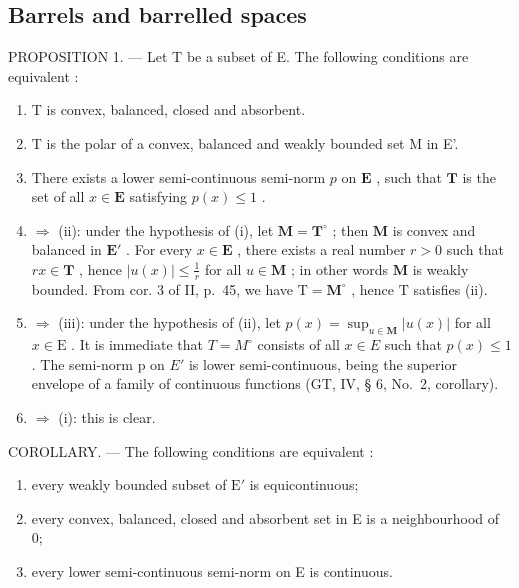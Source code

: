 \subsection{Barrels and barrelled spaces}

PROPOSITION 1. --- Let T be a subset of E. The following conditions are equivalent :

\begin{enumerate}
\def\labelenumi{(\roman{enumi})}
\item
  T is convex, balanced, closed and absorbent.
\item
  T is the polar of a convex, balanced and weakly bounded set M in E'.
\item
  There exists a lower semi-continuous semi-norm \(p\) on \(\mathbf{E}\) , such that \(\mathbf{T}\) is the set of all \(x \in \mathbf{E}\) satisfying \(p(x) \leqslant 1\) .
\item
  \(\Rightarrow\) (ii): under the hypothesis of (i), let \(\mathbf{M} = \mathbf{T}^{\circ}\) ; then \(\mathbf{M}\) is convex and balanced in \(\mathbf{E}'\) . For every \(x \in \mathbf{E}\) , there exists a real number \(r > 0\) such that \(rx \in \mathbf{T}\) , hence \(|u(x)| \leqslant \frac{1}{r}\) for all \(u \in \mathbf{M}\) ; in other words \(\mathbf{M}\) is weakly bounded. From cor. 3 of II, p.~45, we have \(\mathrm{T} = \mathbf{M}^{\circ}\) , hence \(\mathrm{T}\) satisfies (ii).
\item
  \(\Rightarrow\) (iii): under the hypothesis of (ii), let \(p(x) = \sup_{u\in \mathbf{M}}|u(x)|\) for all \(x\in \mathrm{E}\) . It is immediate that \(T = M^{\circ}\) consists of all \(x \in E\) such that \(p(x) \leqslant 1\) . The semi-norm p on \(E'\) is lower semi-continuous, being the superior envelope of a family of continuous functions (GT, IV, § 6, No.~2, corollary).
\item
  \(\Rightarrow\) (i): this is clear.
\end{enumerate}

COROLLARY. --- The following conditions are equivalent :

\begin{enumerate}
\def\labelenumi{(\roman{enumi})}
\item
  every weakly bounded subset of \(\mathrm{E}'\) is equicontinuous;
\item
  every convex, balanced, closed and absorbent set in E is a neighbourhood of 0;
\item
  every lower semi-continuous semi-norm on E is continuous.
\end{enumerate}

